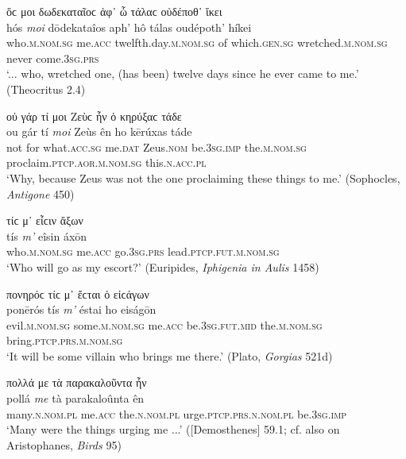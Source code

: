 \begin{exe}
\ex ὅϲ μοι δωδεκαταῖοϲ ἀφ᾽ ὧ τάλαϲ οὐδέποθ᾽ ἵκει\\
\gll hós \emph{moi} dōdekataîos aph' hô tálas oudépoth' híkei\\
who.\textsc{m.nom.sg} me.\textsc{acc} twelfth.day.\textsc{m.nom.sg} of
which.\textsc{gen.sg} wretched.\textsc{m.nom.sg} never come.\textsc{3sg.prs}\\
\trans `... who, wretched one, (has been) twelve days since he ever came to me.' (Theocritus 2.4)
\label{pro2nd4}
\end{exe}

\begin{exe}
\ex οὐ γάρ τί μοι Ζεὺϲ ἦν ὁ κηρύξαϲ τάδε\\
\gll ou gár tí \emph{moi} Zeùs ên ho kērúxas táde\\
not for what.\textsc{acc.sg} me.\textsc{dat} Zeus.\textsc{nom} be.\textsc{3sg.imp} the.\textsc{m.nom.sg} proclaim.\textsc{ptcp.aor.m.nom.sg} this.\textsc{n.acc.pl}\\
\trans `Why, because Zeus was not the one proclaiming these things to me.' (Sophocles, \textit{Antigone} 450)
\label{ptcp1}
\end{exe}

\begin{exe}
\ex τίϲ μ᾽ εἶϲιν ἄξων\\
\gll tís \emph{m'} eîsin áxōn\\
who.\textsc{m.nom.sg} me.\textsc{acc} go.\textsc{3sg.prs} lead.\textsc{ptcp.fut.m.nom.sg}\\
\trans `Who will go as my escort?' (Euripides, \textit{Iphigenia in Aulis} 1458)
\label{ptcp2}
\end{exe}

\begin{exe}
\ex πονηρόϲ τίϲ μ᾽ ἔϲται ὁ εἰϲάγων\\
\gll ponērós tís \emph{m'} éstai ho eiságōn\\
evil.\textsc{m.nom.sg} some.\textsc{m.nom.sg} me.\textsc{acc} be.\textsc{3sg.fut.mid} the.\textsc{m.nom.sg} bring.\textsc{ptcp.prs.m.nom.sg}\\
\trans `It will be some villain who brings me there.' (Plato, \textit{Gorgias} 521d)
\label{ptcp3}
\end{exe}

\begin{exe}
\ex πολλά με τὰ παρακαλοῦντα ἦν\\
\gll pollá \emph{me} tà parakaloûnta ên\\
many.\textsc{n.nom.pl} me.\textsc{acc} the.\textsc{n.nom.pl}
urge.\textsc{ptcp.prs.n.nom.pl} be.\textsc{3sg.imp}\\
\trans `Many were the things urging me ...' ({[}Demosthenes{]} 59.1; cf. also \citealp[64]{Kock1864} on Aristophanes, \textit{Birds} 95)
\label{ptcp4}
\end{exe}

